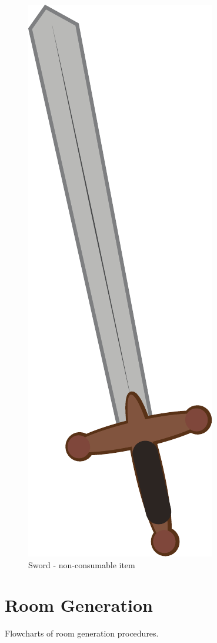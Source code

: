 \begin{figure}[p]
	\centering\includegraphics[height=.8\paperheight]{images/items_sword}
	\caption{Sword - non-consumable item}
\end{figure}

\clearpage



\clearpage
\section{Room Generation}
Flowcharts of room generation procedures.

